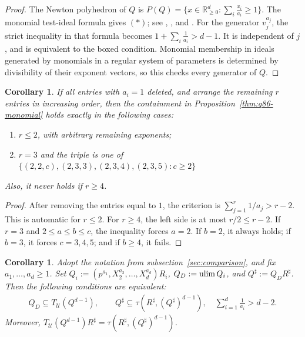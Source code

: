 \documentclass[11pt,a4paper]{amsart}
\numberwithin{equation}{section}
\newtheorem{corollary}[theorem]{Corollary}
\newcommand{\U}{\mathcal{U}}
\begin{document}
 \begin{proof}
 	The Newton polyhedron of $Q$ is
 $P(Q)= \{x\in\mathbb R_{\geq0}^d:
 	\sum_i\frac{x_i}{a_i}\geq1 \}.$
 	The monomial test-ideal formula gives $(\ast)$; see
 	\cite[Theorem 4.8]{HY}, \cite[Example 2.8]{WY}, and
 	\cite[Proposition 8.21]{BMP}. For the generator $v_j^{a_j}$,
 	the strict inequality in that formula becomes
 $1+\sum_i\frac1{a_i}>d-1.$
 	It is independent of $j$, and is equivalent to the boxed
 	condition. Monomial membership in ideals generated by monomials
 	in a regular system of parameters is determined by divisibility
 	of their exponent vectors, so this checks every generator of $Q$.
 \end{proof}
 
 \begin{corollary}
If   all entries with $a_i=1$ deleted, and arrange the remaining $r$ entries
 	in increasing order, then the containment in Proposition~\ref{thm:q86-monomial}
 	holds exactly in the following cases:
 	\begin{enumerate}
 		\item $r\leq2$, with arbitrary remaining exponents;
 		\item $r=3$ and the triple is one of
 		$\{(2,2,c) ,  (2,3,3), (2,3,4), (2,3,5):c\geq2\}$
 	\end{enumerate}
Also, it never holds if $r\geq4$.
 \end{corollary}
 
 \begin{proof}
 	After removing the entries equal to $1$, the criterion is
 	$\sum_{j=1}^r1/a_j>r-2$. This is automatic for $r\leq2$.
 	For $r\geq4$, the left side is at most $r/2\leq r-2$.
 	If $r=3$ and $2\leq a\leq b\leq c$, the inequality forces
 	$a=2$. If $b=2$, it always holds; if $b=3$, it forces
 	$c=3,4,5$; and if $b\geq4$, it fails.
 \end{proof}
 
 
 \begin{corollary}
 	Adopt the notation from
 	subsection~\ref{sec:comparison}, and fix $a_1,\ldots,a_d\geq1$.
 	Set $Q_i:=(p^{a_1},X_2^{a_2},\ldots,X_d^{a_d})R_i$,
 	$Q_D:=\operatorname*{ulim} Q_i$, and $Q^\sharp:=Q_D R^\sharp$.
 	Then the following conditions are equivalent:
 	$$
 	\begin{gathered}
 		Q_D\subseteq T_{\U}(Q^{d-1}),\qquad
 		Q^\sharp\subseteq\tau(R^\sharp,(Q^\sharp)^{d-1}),\quad
 		\sum_{i=1}^d\frac1{a_i}>d-2.
 	\end{gathered}
 	$$
 	Moreover,
 	$T_{\U}(Q^{d-1})R^\sharp=	\tau(R^\sharp,(Q^\sharp)^{d-1})$.
 \end{corollary}
 
\end{document}
